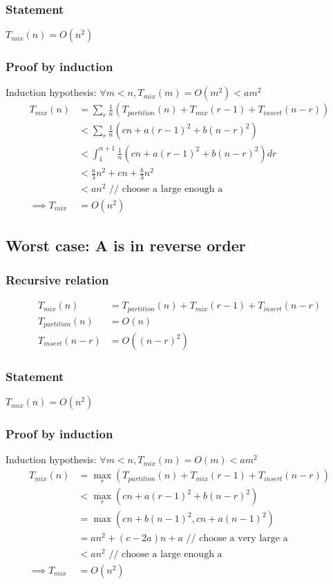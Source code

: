 \documentclass{article}
\begin{document}
\subsubsection{Statement}
$T_{mix}(n) = O(n^2)$

\subsubsection{Proof by induction}
Induction hypothesis: $\forall m < n, T_{mix}(m) = O(m^2) < am^2$
\begin{align*}
T_{mix}(n)
&= \sum_r \frac{1}{n}(T_{partition}(n) + T_{mix}(r-1) + T_{insert}(n-r))\\
&< \sum_r \frac{1}{n}(cn + a(r-1)^2 + b(n-r)^2)\\
&< \int_1^{n+1} \frac{1}{n}(cn + a(r-1)^2 + b(n-r)^2) dr\\
&< \frac{a}{3} n^2 + cn + \frac{b}{3} n^2 \\
&< an^2 \text{ // choose a large enough a}\\
\implies T_{mix} &= O(n^2)
\end{align*}

\subsection{Worst case: A is in reverse order}

\subsubsection{Recursive relation}
\begin{align*}
T_{mix}(n) &= T_{partition}(n) + T_{mix}(r-1) + T_{insert}(n-r)\\
T_{partition}(n) &= O(n)\\
T_{insert}(n-r) &= O((n-r)^2)
\end{align*}

\subsubsection{Statement}
$T_{mix}(n) = O(n^2)$

\subsubsection{Proof by induction}
Induction hypothesis: $\forall m < n, T_{mix}(m) = O(m) < am^2$
\begin{align*}
T_{mix}(n)
&= \max_r (T_{partition}(n) + T_{mix}(r-1) + T_{insert}(n-r))\\
&< \max_r(cn + a(r-1)^2 + b(n-r)^2)\\
&= \max (cn + b(n-1)^2, cn + a(n-1)^2)\\
&= an^2 + (c-2a)n + a \text{ // choose a very large a}\\
&< an^2 \text{ // choose a large enough a}\\
\implies T_{mix} &= O(n^2)
\end{align*}
\end{document}
